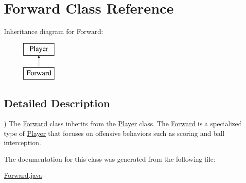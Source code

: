 \hypertarget{classForward}{
\section{Forward Class Reference}
\label{classForward}
}
Inheritance diagram for Forward:\begin{figure}[H]
\begin{center}
\leavevmode
\includegraphics[height=2.000000cm]{classForward}
\end{center}
\end{figure}


\subsection{Detailed Description}
) The \hyperlink{classForward}{Forward} class inherits from the \hyperlink{classPlayer}{Player} class. The \hyperlink{classForward}{Forward} is a specialized type of \hyperlink{classPlayer}{Player} that focuses on offensive behaviors such as scoring and ball interception. 

The documentation for this class was generated from the following file:\begin{DoxyCompactItemize}
\item 
\hyperlink{Forward_8java}{Forward.java}\end{DoxyCompactItemize}
